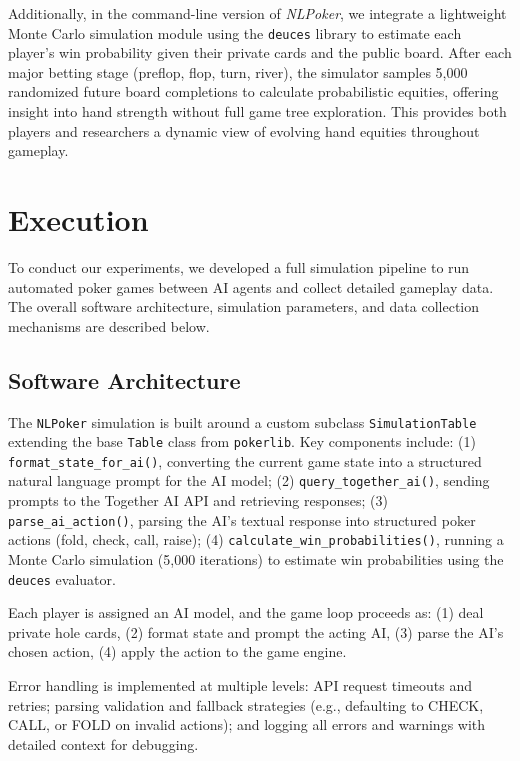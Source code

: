 \documentclass{article}
\begin{document}
Additionally, in the command-line version of \emph{NLPoker}, we integrate a lightweight Monte Carlo simulation module using the \texttt{deuces} library to estimate each player's win probability given their private cards and the public board. After each major betting stage (preflop, flop, turn, river), the simulator samples 5,000 randomized future board completions to calculate probabilistic equities, offering insight into hand strength without full game tree exploration. This provides both players and researchers a dynamic view of evolving hand equities throughout gameplay.

\section{Execution}

To conduct our experiments, we developed a full simulation pipeline to run automated poker games between AI agents and collect detailed gameplay data. The overall software architecture, simulation parameters, and data collection mechanisms are described below.

\subsection{Software Architecture}

The \texttt{NLPoker} simulation is built around a custom subclass \texttt{SimulationTable} extending the base \texttt{Table} class from \texttt{pokerlib}. Key components include: (1) \texttt{format\_state\_for\_ai()}, converting the current game state into a structured natural language prompt for the AI model; (2) \texttt{query\_together\_ai()}, sending prompts to the Together AI API and retrieving responses; (3) \texttt{parse\_ai\_action()}, parsing the AI's textual response into structured poker actions (fold, check, call, raise); (4) \texttt{calculate\_win\_probabilities()}, running a Monte Carlo simulation (5,000 iterations) to estimate win probabilities using the \texttt{deuces} evaluator.

Each player is assigned an AI model, and the game loop proceeds as: (1) deal private hole cards, (2) format state and prompt the acting AI, (3) parse the AI's chosen action, (4) apply the action to the game engine.

Error handling is implemented at multiple levels: API request timeouts and retries; parsing validation and fallback strategies (e.g., defaulting to CHECK, CALL, or FOLD on invalid actions); and logging all errors and warnings with detailed context for debugging.
\end{document}
